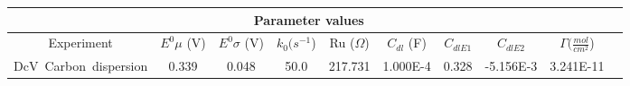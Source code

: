 \documentclass[preview]{standalone}
\begin{document}
\begin{center}
\begin{tabular}{|c|c|c|c|c|c|c|c|c|c|}
\hline
\multicolumn{9}{|c|}{Parameter values}\\ 
\hline
Experiment & $E^0 \mu$ (V) & $E^0 \sigma$ (V) & $k_0 (s^{-1}$) & Ru ($\Omega$) & $C_{dl}$ (F) & $C_{dlE1}$ & $C_{dlE2}$ & $\Gamma (\frac{mol}{cm^{2}}$)\\
\hline
DcV\ Carbon\ dispersion & 0.339 & 0.048 & 50.0 & 217.731 & 1.000E-4 & 0.328 & -5.156E-3 & 3.241E-11\\
\hline
\end{tabular}
\end{center}
\end{document}
